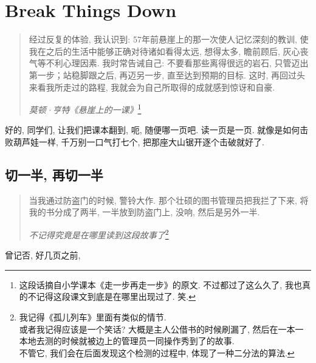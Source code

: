 \chapter{Break Things Down}

\begin{quotation}
  经过反复的体验, 我认识到: 57年前悬崖上的那一次使人记忆深刻的教训, 使我在之后的生活中能够正确对待诸如看得太远, 想得太多, 瞻前顾后, 灰心丧气等不利心理因素. 我时常告诫自己: 不要看那些离得很远的岩石, 只管迈出第一步；站稳脚跟之后, 再迈另一步, 直至达到预期的目标. 这时, 再回过头来看我所走过的路程, 我就会为自己所取得的成就感到惊讶和自豪. 

  \emph{莫顿·亨特《悬崖上的一课》}\footnote{这段话摘自小学课本《走一步再走一步》的原文. 不过都过了这么久了, 我也真的不记得这段课文到底是在哪里出现过了. 笑. }
\end{quotation}

好的, 同学们, 让我们把课本翻到, 呃, 随便哪一页吧. 读一页是一页. 就像是如何击败葫芦娃一样, 千万别一口气打七个, 把那座大山锯开逐个击破就好了. 

\section{切一半, 再切一半}
\begin{quotation}
  当我通过防盗门的时候, 警铃大作. 那个壮硕的图书管理员把我拦了下来, 将我的书分成了两半, 一半放到防盗门上, 没响, 然后是另外一半. 

  \emph{不记得究竟是在哪里读到这段故事了}\footnote{我记得《孤儿列车》里面有类似的情节. \\ 或者我记得应该是一个笑话? 大概是主人公借书的时候刷漏了, 然后在一本一本地去测的时候就被边上的管理员一同操作秀到了的故事. \\ 不管它, 我们会在后面发现这个检测的过程中, 体现了一种二分法的算法. }
\end{quotation}

曾记否, 好几页之前, 
